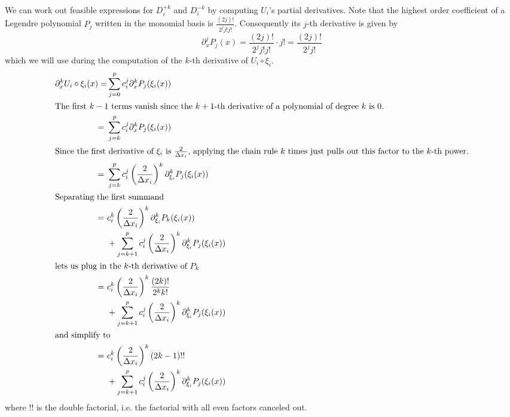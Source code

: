 We can work out feasible expressions for $D_{i}^{+k}$ and $D_{i}^{-k}$ by computing $U_{i}$'s partial derivatives.
Note that the highest order coefficient of a Legendre polynomial $P_{j}$ written in the monomial basis is $\frac{(2j)!}{2^{j} j! j!}$.
Consequently its $j$-th derivative is given by
\begin{equation*}
  \partial_{x}^{j} P_{j}(x) = \frac{(2j)!}{2^{j} j! j!} \cdot j! = \frac{(2j)!}{2^{j} j!}
\end{equation*}
which we will use during the computation of the $k$-th derivative of $U_{i} \circ \xi_{i}$.
\begin{align}
  \partial_{x}^{k} U_{i} \circ \xi_{i}(x) = & \sum_{j = 0}^{p} c_{i}^{j} \partial_{x}^{k} P_{j}(\xi_{i}(x))\nonumber\\
  \intertext{The first $k - 1$ terms vanish since the $k + 1$-th derivative of a polynomial of degree $k$ is $0$.}
  =~& \sum_{j = k}^{p} c_{i}^{j} \partial_{x}^{k} P_{j}(\xi_{i}(x))\nonumber\\
  \intertext{Since the first derivative of $\xi_{i}$ is $\frac{2}{\Delta x_{i}}$, applying the chain rule $k$ times just pulls out this factor to the $k$-th power.}
  =~& \sum_{j = k}^{p} c_{i}^{j} \left( \frac{2}{\Delta x_{i}} \right)^{k} \partial_{\xi_{i}}^{k} P_{j}(\xi_{i}(x))\nonumber\\
  \intertext{Separating the first summand}
  =~& c_{i}^{k} \left( \frac{2}{\Delta x_{i}} \right)^{k} \partial_{\xi_{i}}^{k} P_{k}(\xi_{i}(x))\\
  & + \sum_{j = k + 1}^{p} c_{i}^{j} \left( \frac{2}{\Delta x_{i}} \right)^{k} \partial_{\xi_{i}}^{k} P_{j}(\xi_{i}(x))\nonumber\\
  \intertext{lets us plug in the $k$-th derivative of $P_{k}$}
  =~& c_{i}^{k} \left( \frac{2}{\Delta x_{i}} \right)^{k} \frac{(2k)!}{2^{k} k!}\\
  & + \sum_{j = k + 1}^{p} c_{i}^{j} \left( \frac{2}{\Delta x_{i}} \right)^{k} \partial_{\xi_{i}}^{k} P_{j}(\xi_{i}(x))\nonumber\\
  \intertext{and simplify to}
  =~& c_{i}^{k} \left( \frac{2}{\Delta x_{i}} \right)^{k} \left( 2k - 1 \right)!!\\
  & + \sum_{j = k + 1}^{p} c_{i}^{j} \left( \frac{2}{\Delta x_{i}} \right)^{k} \partial_{\xi_{i}}^{k} P_{j}(\xi_{i}(x)) \label{eq:kth-deriv}
\end{align}
where $!!$ is the double factorial, i.e. the factorial with all even factors canceled out.

